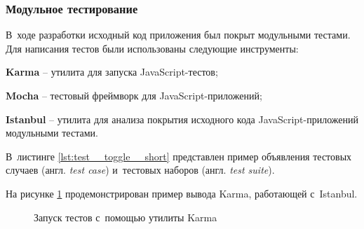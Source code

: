 \documentclass[pta]{../../../../scs-iam}
\begin{document}
\subsubsection{Модульное тестирование}

В~ходе разработки исходный код приложения был покрыт модульными тестами. Для написания тестов были использованы следующие инструменты:
\begin{dashitemize}
  \item \textbf{Karma} -- утилита для запуска JavaScript-тестов;
  \item \textbf{Mocha} -- тестовый фреймворк для JavaScript-приложений;
  \item \textbf{Istanbul} -- утилита для анализа покрытия исходного кода JavaScript-приложений модульными тестами.
\end{dashitemize}

В~листинге \ref{lst:test__toggle__short} представлен пример объявления тестовых случаев (англ. \emph{test case}) и~тестовых наборов (англ. \emph{test suite}).



На рисунке \ref{fig:karma-output} продемонстрирован пример вывода Karma, работающей с~Istanbul.

\begin{figure}[h!]
  \centering
  \setlength{\fboxsep}{5pt}
  \vspace*{6pt}
  \caption{Запуск тестов с~помощью утилиты Karma}
  \label{fig:karma-output}
\end{figure}
\end{document}
